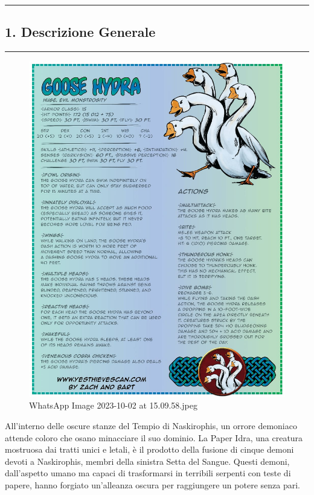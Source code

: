 \begin{center}\rule{0.5\linewidth}{0.5pt}\end{center}

\subsection{1. Descrizione Generale}\label{descrizione-generale}

\begin{center}\rule{0.5\linewidth}{0.5pt}\end{center}

\begin{figure}
\centering
\includegraphics{WhatsApp_Image_2023-10-02_at_15.09.58.jpeg}
\caption{WhatsApp Image 2023-10-02 at 15.09.58.jpeg}
\end{figure}

All'interno delle oscure stanze del Tempio di Naskirophis, un orrore
demoniaco attende coloro che osano minacciare il suo dominio. La Paper
Idra, una creatura mostruosa dai tratti unici e letali, è il prodotto
della fusione di cinque demoni devoti a Naskirophis, membri della
sinistra Setta del Sangue. Questi demoni, dall'aspetto umano ma capaci
di trasformarsi in terribili serpenti con teste di papere, hanno
forgiato un'alleanza oscura per raggiungere un potere senza pari.

